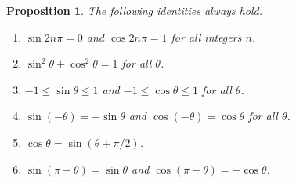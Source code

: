 \documentclass[a4paper,leqno]{article}
\newcommand{\marginsymbol}{\marginpar{\hfill(\ding{43})}}
\numberwithin{equation}{section}
\newtheorem{prp}[equation]{Proposition}
\theoremstyle{definition}
\theoremstyle{remark}
\begin{document}
\begin{prp}\label{thm:basicids}
  The following identities always hold.
  \begin{enumerate}
    \item $ \sin 2n\pi = 0 $ and $ \cos 2n\pi = 1 $ for all integers $ n $.
    \item $ \sin^2 \theta + \cos^2 \theta = 1 $ for all $ \theta $. \marginsymbol
    \item $ -1 \leq \sin \theta \leq 1 $ and $ -1 \leq \cos \theta \leq 1 $ for all $ \theta $.
    \item $ \sin (-\theta) = -\sin \theta $ and $ \cos (-\theta) = \cos \theta $ for all $ \theta $.
    \item $ \cos \theta = \sin (\theta + \pi/2) $.
    \item $ \sin (\pi - \theta) = \sin \theta $ and $ \cos(\pi - \theta) = -\cos \theta $.
  \end{enumerate}
\end{prp}
\end{document}
